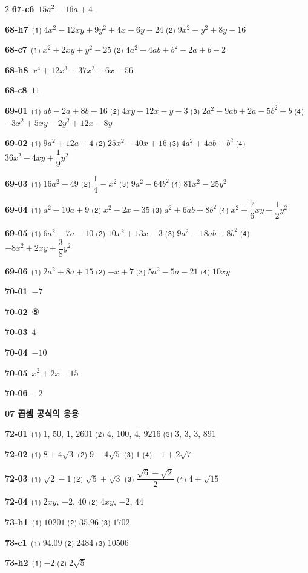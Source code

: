 \documentclass[10pt,a4paper]{article}
\begin{document}
\begin{multicols}{2}
\noindent\textbf{67-c6}\ $15a^2-16a+4$\par
\noindent\textbf{68-h7}\ ⑴ $4x^2-12xy+9y^2+4x-6y-24$ ⑵ $9x^2-y^2+8y-16$\par
\noindent\textbf{68-c7}\ ⑴ $x^2+2xy+y^2-25$ ⑵ $4a^2-4ab+b^2-2a+b-2$\par
\noindent\textbf{68-h8}\ $x^4+12x^3+37x^2+6x-56$\par
\noindent\textbf{68-c8}\ $11$\par
\noindent\textbf{69-01}\ ⑴ $ab-2a+8b-16$ ⑵ $4xy+12x-y-3$ ⑶ $2a^2-9ab+2a-5b^2+b$ ⑷ $-3x^2+5xy-2y^2+12x-8y$\par
\noindent\textbf{69-02}\ ⑴ $9a^2+12a+4$ ⑵ $25x^2-40x+16$ ⑶ $4a^2+4ab+b^2$ ⑷ $36x^2-4xy+\dfrac{1}{9}y^2$\par
\noindent\textbf{69-03}\ ⑴ $16a^2-49$ ⑵ $\dfrac{1}{4}-x^2$ ⑶ $9a^2-64b^2$ ⑷ $81x^2-25y^2$\par
\noindent\textbf{69-04}\ ⑴ $a^2-10a+9$ ⑵ $x^2-2x-35$ ⑶ $a^2+6ab+8b^2$ ⑷ $x^2+\dfrac{7}{6}xy-\dfrac{1}{2}y^2$\par
\noindent\textbf{69-05}\ ⑴ $6a^2-7a-10$ ⑵ $10x^2+13x-3$ ⑶ $9a^2-18ab+8b^2$ ⑷ $-8x^2+2xy+\dfrac{3}{8}y^2$\par
\noindent\textbf{69-06}\ ⑴ $2a^2+8a+15$ ⑵ $-x+7$ ⑶ $5a^2-5a-21$ ⑷ $10xy$\par
\noindent\textbf{70-01}\ $-7$\par
\noindent\textbf{70-02}\ ⑤\par
\noindent\textbf{70-03}\ $4$\par
\noindent\textbf{70-04}\ $-10$\par
\noindent\textbf{70-05}\ $x^2+2x-15$\par
\noindent\textbf{70-06}\ $-2$\par
\noindent\textbf{07 곱셈 공식의 응용}\par\smallskip
\noindent\textbf{72-01}\ ⑴ $1$, $50$, $1$, $2601$ ⑵ $4$, $100$, $4$, $9216$ ⑶ $3$, $3$, $3$, $891$\par
\noindent\textbf{72-02}\ ⑴ $8+4\sqrt{3}$ ⑵ $9-4\sqrt{5}$ ⑶ $1$ ⑷ $-1+2\sqrt{7}$\par
\noindent\textbf{72-03}\ ⑴ $\sqrt{2}-1$ ⑵ $\sqrt{5}+\sqrt{3}$ ⑶ $\dfrac{\sqrt{6}-\sqrt{2}}{2}$ ⑷ $4+\sqrt{15}$\par
\noindent\textbf{72-04}\ ⑴ $2xy$, $-2$, $40$ ⑵ $4xy$, $-2$, $44$\par
\noindent\textbf{73-h1}\ ⑴ $10201$ ⑵ $35.96$ ⑶ $1702$\par
\noindent\textbf{73-c1}\ ⑴ $94.09$ ⑵ $2484$ ⑶ $10506$\par
\noindent\textbf{73-h2}\ ⑴ $-2$ ⑵ $2\sqrt{5}$\par

\end{multicols}
\end{document}
